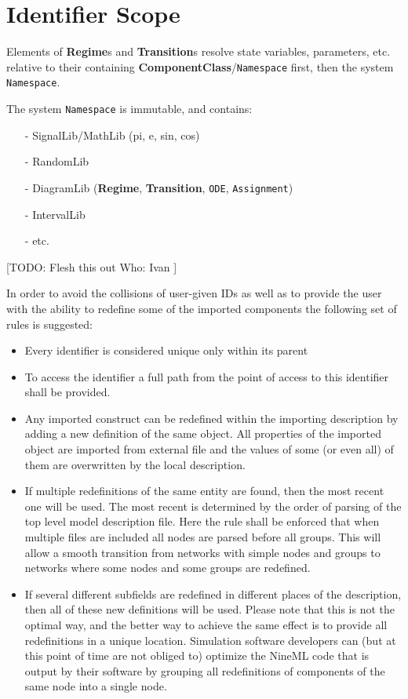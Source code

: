 \documentclass{article}
\newcommand{\ComponentClass}{{\bf{ComponentClass}}\xspace}
\newcommand{\Regime}{{\bf{Regime}}\xspace}
\newcommand{\Regimes}{{\bf{Regime}}s\xspace}
\newcommand{\Transition}{{\bf{Transition}}\xspace}
\newcommand{\Transitions}{{\bf{Transition}}s\xspace}
\begin{document}
\section{Identifier Scope}
\label{scope}

Elements of \Regimes and \Transitions resolve state
variables, parameters, etc. relative to their containing
\ComponentClass/{\tt Namespace} first, then the system {\tt Namespace}.

The system {\tt Namespace} is immutable, and contains:
\begin{itemize}
\item[-]{SignalLib/MathLib (pi, e, sin, cos)}
\item[-]{RandomLib}
\item[-]{DiagramLib (\Regime, \Transition, {\tt ODE},
{\tt Assignment})}
\item[-]{IntervalLib}
\item[-]{etc.}
\end{itemize}

[TODO:
Flesh this out
Who: Ivan
]

In order to avoid the collisions of user-given IDs as well as to
provide the user with the ability to redefine some of the imported
components the following set of rules is suggested:
\begin{itemize}
\item{Every identifier is considered unique only within its parent}
\item{To access the identifier a full path from the point of access
to this identifier shall be provided.}
\item{Any imported construct can be redefined within the importing
description by adding a new definition of the same object. All properties
of the imported object are imported from external file and the values of
some (or even all) of them are overwritten by the local description.}
\item{If multiple redefinitions of the same entity are found, then the most
recent one will be used. The most recent is determined by the order of
parsing of the top level model description file. Here the rule shall be
enforced that when multiple files are included all nodes are parsed before
all groups. This will allow a smooth transition from networks with simple
nodes and groups to networks where some nodes and some groups are redefined.}
\item{If several different subfields are redefined in different places of the
description, then all of these new definitions will be used. Please note that
this is not the optimal way, and the better way to achieve the same effect is
to provide all redefinitions in a unique location. Simulation software
developers can (but at this point of time are not obliged to) optimize the
NineML code that is output by their software by grouping all redefinitions
of components of the same node into a single node.}
\end{itemize}
\end{document}
